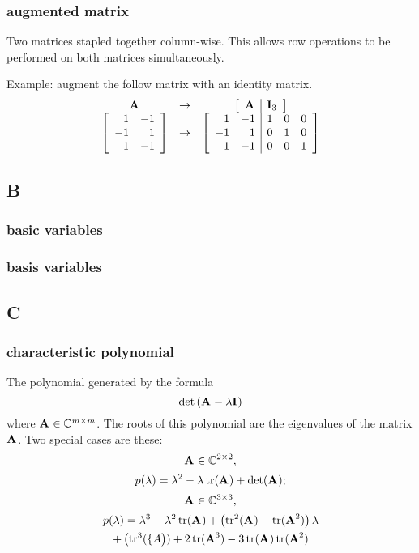 \subsubsection*{augmented matrix}
Two matrices stapled together column-wise. This allows row operations to be performed on both matrices simultaneously.

Example: augment the follow matrix with an identity matrix.
\begin{equation}
\begin{array}{ccc}
  \A{} & \to & \mat{c|c}{\A{}&\I{3}} \\
  \Aexample & \to & \mat{rr|ccc}{1 & -1 & 1 & 0 & 0\\-1 & 1 & 0 & 1 & 0\\1 & -1 & 0 & 0 & 1}
\end{array}
\end{equation}

\subsection*{B} 

\subsubsection*{basic variables}
\subsubsection*{basis variables}

\subsection*{C} 

\subsubsection*{characteristic polynomial}
The polynomial generated by the formula
\begin{equation}
  \det \paren{\A{}-\lambda \I{}}
\end{equation}
where $\Ac{m}$. The roots of this polynomial are the eigenvalues of the matrix $\A{}$. Two special cases are these:
\begin{equation*}
  \Ac{2},
\end{equation*}
\begin{equation}
  p(\lambda) = \lambda^{2} -\lambda     \tr (\A{}) + \det(\A{});
\end{equation}
\begin{equation}
  \Ac{3},
\end{equation}
\begin{multline}
  p(\lambda) = \lambda^{3} -\lambda^{2} \tr (\A{}) + \paren{\tr^{2}(\A{})-\tr(\A{2})}\lambda\\
   + \paren{\tr^{3}(\{A})+2\tr(\A{3})-3\tr(\A{})\tr(\A{2})
\end{multline}
